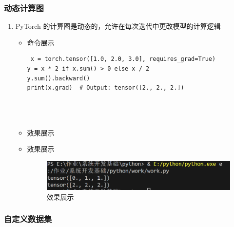 \documentclass[UTF8]{ctexart}
\begin{document}
\subsubsection{动态计算图}

\begin{enumerate}
  \item PyTorch 的计算图是动态的，允许在每次迭代中更改模型的计算逻辑
  \begin{itemize}
  \item 命令展示
  \begin{verbatim}
 x = torch.tensor([1.0, 2.0, 3.0], requires_grad=True)
y = x * 2 if x.sum() > 0 else x / 2
y.sum().backward()
print(x.grad)  # Output: tensor([2., 2., 2.])


    
  \end{verbatim}

\item 效果展示
\item 效果展示
 \begin{figure}[H]
    \centering
    \includegraphics[width=\textwidth]{32} %
    \caption{效果展示}
  \end{figure}

  \end{itemize}
\end{enumerate}




















\subsubsection{自定义数据集}
\end{document}
